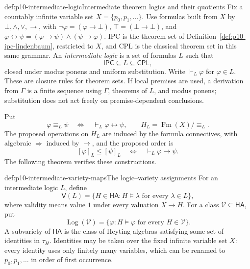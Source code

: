 \begin{hbdefinition}{def:p10-intermediate-logic}{Intermediate theorem logics and their quotients}
Fix a countably infinite variable set \(X=\{p_0,p_1,\ldots\}\).
Use formulas built from \(X\) by \(\bot,\wedge,\vee,\to\), with
\(\neg\varphi=(\varphi\to\bot)\), \(\top=(\bot\to\bot)\), and
\(\varphi\leftrightarrow\psi=(\varphi\to\psi)\wedge(\psi\to\varphi)\).
IPC is the theorem set of Definition~\ref{def:p10-ipc-lindenbaum},
restricted to \(X\), and CPL is the classical theorem set in this
same grammar.
An \emph{intermediate logic} is a set of formulas \(L\) such that
\[
 \mathsf{IPC}\subseteq L\subseteq\mathsf{CPL},
\]
closed under modus ponens and uniform substitution.
Write \(\vdash_L\varphi\) for \(\varphi\in L\).
These are closure rules for theorem sets.
If local premises are used, a derivation from \(\Gamma\) is a finite
sequence using \(\Gamma\), theorems of \(L\), and modus ponens;
substitution does not act freely on premise-dependent conclusions.

Put
\[
 \varphi\equiv_L\psi\quad\Longleftrightarrow\quad
                    \vdash_L\varphi\leftrightarrow\psi,
 \qquad H_L=\operatorname{Fm}(X)/{\equiv_L}.
\]
The proposed operations on \(H_L\) are induced by the formula
connectives, with algebraic \(\Rightarrow\) induced by \(\to\), and
the proposed order is
\[
 [\varphi]_L\leq[\psi]_L
       \quad\Longleftrightarrow\quad\vdash_L\varphi\to\psi.
\]
The following theorem verifies these constructions.
\end{hbdefinition}

\begin{hbdefinition}{def:p10-intermediate-variety-maps}{The logic--variety assignments}
For an intermediate logic \(L\), define
\[
 \mathsf V(L)=\{H\in\mathsf{HA}:H\models\lambda
                                      \text{ for every }\lambda\in L\},
\]
where validity means value \(1\) under every valuation \(X\to H\).
For a class \(\mathcal V\subseteq\mathsf{HA}\), put
\[
 \operatorname{Log}(\mathcal V)
    =\{\varphi:H\models\varphi\text{ for every }H\in\mathcal V\}.
\]
A subvariety of \(\mathsf{HA}\) is the class of Heyting algebras
satisfying some set of identities in \(\tau_H\).
Identities may be taken over the fixed infinite variable set \(X\):
every identity uses only finitely many variables, which can be renamed
to \(p_0,p_1,\ldots\) in order of first occurrence.
\end{hbdefinition}

